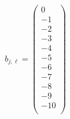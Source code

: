 \documentclass{article}
\begin{document}
\begin{align*}
  b_{j,\ell} = 
  \left(
\begin{array}{c}
 0 \\
 -1 \\
 -2 \\
 -3 \\
 -4 \\
 -5 \\
 -6 \\
 -7 \\
 -8 \\
 -9 \\
 -10 \\
\end{array}
\right)
\end{align*}
\end{document}
